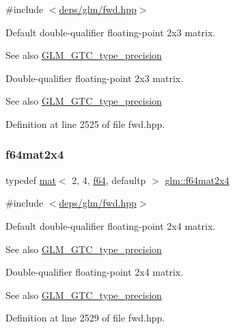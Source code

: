 {\ttfamily \#include $<$\hyperlink{fwd_8hpp}{deps/glm/fwd.\+hpp}$>$}

Default double-\/qualifier floating-\/point 2x3 matrix. \begin{DoxySeeAlso}{See also}
\hyperlink{group__gtc__type__precision}{G\+L\+M\+\_\+\+G\+T\+C\+\_\+type\+\_\+precision}
\end{DoxySeeAlso}
Double-\/qualifier floating-\/point 2x3 matrix. \begin{DoxySeeAlso}{See also}
\hyperlink{group__gtc__type__precision}{G\+L\+M\+\_\+\+G\+T\+C\+\_\+type\+\_\+precision} 
\end{DoxySeeAlso}


Definition at line 2525 of file fwd.\+hpp.

\mbox{\label{group__gtc__type__precision_gae075a2083e1801ada5c99c91f79eb6ed}} 
\subsubsection{\texorpdfstring{f64mat2x4}{f64mat2x4}}
{\footnotesize\ttfamily typedef \hyperlink{structglm_1_1mat}{mat}$<$ 2, 4, \hyperlink{group__gtc__type__precision_ga2bba392e555124b36cde6abba349bab3}{f64}, defaultp $>$ \hyperlink{group__gtc__type__precision_gae075a2083e1801ada5c99c91f79eb6ed}{glm\+::f64mat2x4}}



{\ttfamily \#include $<$\hyperlink{fwd_8hpp}{deps/glm/fwd.\+hpp}$>$}

Default double-\/qualifier floating-\/point 2x4 matrix. \begin{DoxySeeAlso}{See also}
\hyperlink{group__gtc__type__precision}{G\+L\+M\+\_\+\+G\+T\+C\+\_\+type\+\_\+precision}
\end{DoxySeeAlso}
Double-\/qualifier floating-\/point 2x4 matrix. \begin{DoxySeeAlso}{See also}
\hyperlink{group__gtc__type__precision}{G\+L\+M\+\_\+\+G\+T\+C\+\_\+type\+\_\+precision} 
\end{DoxySeeAlso}


Definition at line 2529 of file fwd.\+hpp.

\mbox{\label{group__gtc__type__precision_ga44a41778554076393a2c59a98fe5128e}} 
